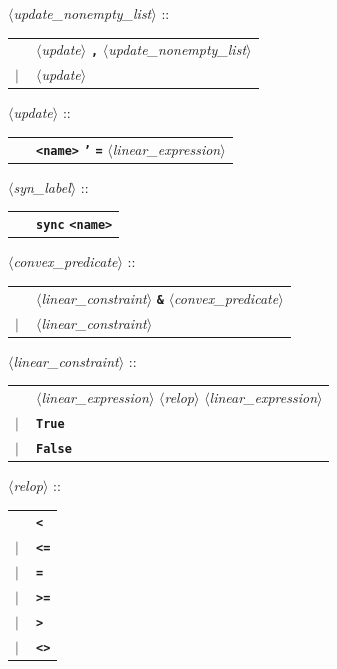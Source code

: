 \documentclass[a4paper,11pt]{article}
\newcommand{\nt}[1]{$\langle$\emph{#1}$\rangle$}
\newcommand{\regleGrammaire}[1]{\bigskip \noindent \nt{#1} :: \\}
\newcommand{\code}[1]{\textbf{\texttt{#1}}}
\begin{document}
\regleGrammaire{update\_nonempty\_list}
\begin{tabular}{l l}
	\  & \nt{update} \code{,} \nt{update\_nonempty\_list} \\
	$|$ & \nt{update} \\
\end{tabular}

\regleGrammaire{update}
\begin{tabular}{l l}
	\  & \code{<name>} \code{'} \code{=} \nt{linear\_expression} \\
\end{tabular}

\regleGrammaire{syn\_label}
\begin{tabular}{l l}
	\  & \code{sync} \code{<name>} \\
\end{tabular}



\regleGrammaire{convex\_predicate}
\begin{tabular}{l l}
	\  & \nt{linear\_constraint} \code{\&} \nt{convex\_predicate} \\
	$|$ & \nt{linear\_constraint} \\
\end{tabular}

\regleGrammaire{linear\_constraint}
\begin{tabular}{l l}
	\  & \nt{linear\_expression} \nt{relop} \nt{linear\_expression} \\
	$|$ & \code{True} \\
	$|$ & \code{False} \\
\end{tabular}

\regleGrammaire{relop}
\begin{tabular}{l l}
	\  & \code{<} \\
	$|$ & \code{<=} \\
	$|$ & \code{=} \\
	$|$ & \code{>=} \\
	$|$ & \code{>} \\
	$|$ & \code{<>} \\
\end{tabular}
\end{document}
